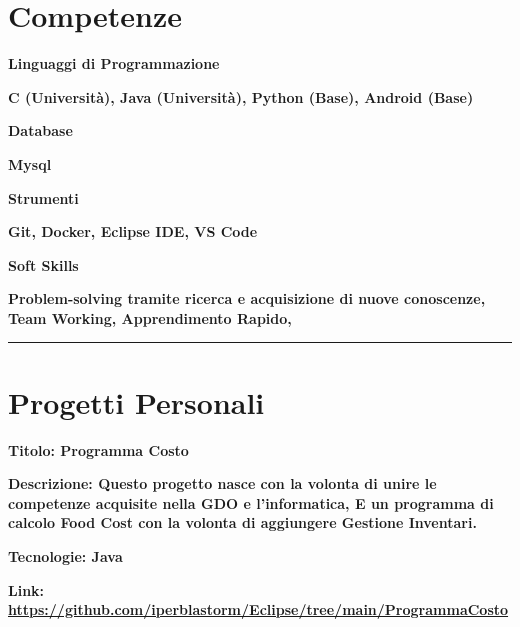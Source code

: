 \documentclass{article}
\newenvironment{listaIdentazione}[1]{
			\begin{list}{}{
			  \setlength{\leftmargin}{#1} %
			  \setlength{\itemsep}{0pt}	%
			  \setlength{\parskip}{0pt} %
			  \setlength{\parsep}{0pt} %
			  \setlength{\labelwidth}{0pt} %
			  \setlength{\labelsep}{0pt} %
			  \renewcommand{\makelabel}[1]{} %
			  }
			}{\end{list}}
\newcommand{\spaziocorto}{\\[0.1cm]}
\newcommand{\spaziolungo}{\\[0.3cm]}
\begin{document}
\section*{\large{Competenze}}
\begin{flushleft}
		\textbf{\normalsize{Linguaggi di Programmazione}}
		\spaziocorto
			\begin{listaIdentazione}{0.5cm}
			\item{\textbf{\normalsize{C (Università), Java (Università), Python (Base),
			Android (Base)}}}
			\spaziocorto
			\end{listaIdentazione}
						
		\textbf{\normalsize{Database}}
		\spaziocorto
			\begin{listaIdentazione}{0.5cm}
			\item{\textbf{\normalsize{Mysql}}}
			\spaziocorto
			\end{listaIdentazione}
			
		\textbf{\normalsize{Strumenti}}
		\spaziocorto
			\begin{listaIdentazione}{0.5cm}
			\item{\textbf{\normalsize{Git, Docker, Eclipse IDE, VS Code}}}
			\spaziocorto
			\end{listaIdentazione}
			
		\textbf{\normalsize{Soft Skills}}
		\spaziocorto
			\begin{listaIdentazione}{0.5cm}
			\item{\textbf{\normalsize{Problem-solving tramite ricerca e acquisizione di nuove conoscenze, Team Working, Apprendimento Rapido, }}}
			\spaziocorto
			\end{listaIdentazione}
\end{flushleft}

\hrule

\section*{\large{Progetti Personali}}
	\begin{flushleft}
		\textbf{\normalsize{Titolo: Programma Costo}}
		\spaziocorto
			\begin{listaIdentazione}{0.5cm}
			\item {\textbf{\normalsize{Descrizione: Questo progetto nasce con la volonta di unire le competenze acquisite nella GDO e l'informatica, E un programma di calcolo Food Cost con la volonta di aggiungere Gestione Inventari.}}}
			\spaziocorto
			\item {\textbf{\normalsize{Tecnologie: Java}}}
			\spaziocorto
			\item {\textbf{\normalsize{Link: \url{https://github.com/iperblastorm/Eclipse/tree/main/ProgrammaCosto}}}}
			\spaziolungo
			\end{listaIdentazione}
\end{flushleft}
\end{document}
